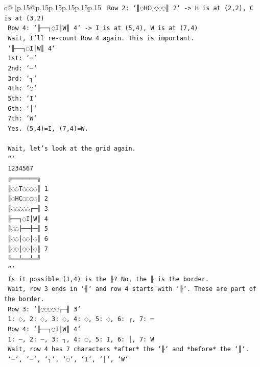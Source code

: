 \documentclass{article}
\begin{document}
{\begin{supertabular}{c@{$\;$}|p{.15\linewidth}@{}p{.15\linewidth}p{.15\linewidth}p{.15\linewidth}p{.15\linewidth}p{.15\linewidth}}
{{{\texttt{    Row 2: `║◌HC◌◌◌◌║ 2` {-}> H is at (2,2), C is at (3,2)} \\
\texttt{    Row 4: `╟──┐◌I│W║ 4` {-}> I is at (5,4), W is at (7,4)} \\
\texttt{    Wait, I'll re{-}count Row 4 again. This is important.} \\
\texttt{    `╟──┐◌I│W║ 4`} \\
\texttt{    1st: `─`} \\
\texttt{    2nd: `─`} \\
\texttt{    3rd: `┐`} \\
\texttt{    4th: `◌`} \\
\texttt{    5th: `I`} \\
\texttt{    6th: `│`} \\
\texttt{    7th: `W`} \\
\texttt{    Yes. (5,4)=I, (7,4)=W.} \\
\\ 
\texttt{    Wait, let's look at the grid again.} \\
\texttt{    ```} \\
\texttt{     1234567} \\
\texttt{    ╔═══════╗} \\
\texttt{    ║◌◌T◌◌◌◌║ 1} \\
\texttt{    ║◌HC◌◌◌◌║ 2} \\
\texttt{    ║◌◌◌◌◌┌─╢ 3} \\
\texttt{    ╟──┐◌I│W║ 4} \\
\texttt{    ║◌◌├──┼─╢ 5} \\
\texttt{    ║◌◌│◌◌│◌║ 6} \\
\texttt{    ║◌◌│◌◌│◌║ 7} \\
\texttt{    ╚══╧══╧═╝} \\
\texttt{    ```} \\
\texttt{    Is it possible (1,4) is the ╟? No, the ╟ is the border.} \\
\texttt{    Wait, row 3 ends in `╢` and row 4 starts with `╟`. These are part of the border.} \\
\texttt{    Row 3: `║◌◌◌◌◌┌─╢ 3`} \\
\texttt{    1: ◌, 2: ◌, 3: ◌, 4: ◌, 5: ◌, 6: ┌, 7: ─} \\
\texttt{    Row 4: `╟──┐◌I│W║ 4`} \\
\texttt{    1: ─, 2: ─, 3: ┐, 4: ◌, 5: I, 6: │, 7: W} \\
\texttt{    Wait, row 4 has 7 characters *after* the `╟` and *before* the `║`.} \\
\texttt{    `─`, `─`, `┐`, `◌`, `I`, `│`, `W`} \\
}}}
\end{supertabular}}
\end{document}
